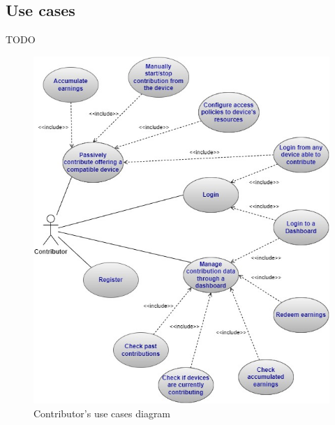 \subsection{Use cases}
TODO

\begin{figure}[!ht]
    \centering
    \includegraphics[width=\linewidth]{document/chapters/chapter_5/images/contributor_use_cases.jpg}
    \caption{Contributor's use cases diagram}
    \label{fig:use_cases_contributor}
\end{figure}

